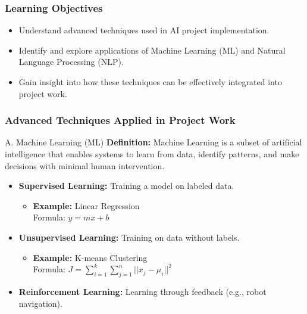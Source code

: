 \documentclass[aspectratio=169]{beamer}
\begin{document}
\begin{frame}
    \frametitle{Learning Objectives}
    \begin{itemize}
        \item Understand advanced techniques used in AI project implementation.
        \item Identify and explore applications of Machine Learning (ML) and Natural Language Processing (NLP).
        \item Gain insight into how these techniques can be effectively integrated into project work.
    \end{itemize}
\end{frame}

\begin{frame}
    \frametitle{Advanced Techniques Applied in Project Work}
    \begin{block}{A. Machine Learning (ML)}
        \textbf{Definition:} Machine Learning is a subset of artificial intelligence that enables systems to learn from data, identify patterns, and make decisions with minimal human intervention.
        \begin{itemize}
            \item \textbf{Supervised Learning:} Training a model on labeled data.
            \begin{itemize}
                \item \textbf{Example:} Linear Regression \\
                Formula: \( y = mx + b \)
            \end{itemize}
            \item \textbf{Unsupervised Learning:} Training on data without labels.
            \begin{itemize}
                \item \textbf{Example:} K-means Clustering \\
                Formula: \( J = \sum_{i=1}^{k} \sum_{j=1}^{n} ||x_j - \mu_i||^2 \)
            \end{itemize}
            \item \textbf{Reinforcement Learning:} Learning through feedback (e.g., robot navigation).
        \end{itemize}
    \end{block}
\end{frame}
\end{document}
